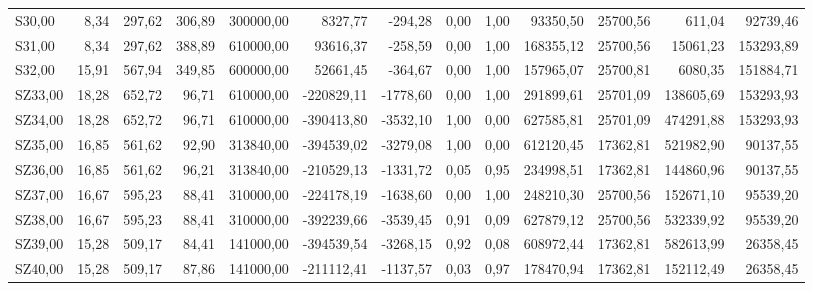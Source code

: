 \begin{longtable}{lrrrrrrrrrrrr}
S30,00 & 8,34 & 297,62 & 306,89 & 300000,00 & 8327,77 & -294,28 & 0,00 & 1,00 & 93350,50 & 25700,56 & 611,04 & 92739,46 \\
S31,00 & 8,34 & 297,62 & 388,89 & 610000,00 & 93616,37 & -258,59 & 0,00 & 1,00 & 168355,12 & 25700,56 & 15061,23 & 153293,89 \\
S32,00 & 15,91 & 567,94 & 349,85 & 600000,00 & 52661,45 & -364,67 & 0,00 & 1,00 & 157965,07 & 25700,81 & 6080,35 & 151884,71 \\
SZ33,00 & 18,28 & 652,72 & 96,71 & 610000,00 & -220829,11 & -1778,60 & 0,00 & 1,00 & 291899,61 & 25701,09 & 138605,69 & 153293,93 \\
SZ34,00 & 18,28 & 652,72 & 96,71 & 610000,00 & -390413,80 & -3532,10 & 1,00 & 0,00 & 627585,81 & 25701,09 & 474291,88 & 153293,93 \\
SZ35,00 & 16,85 & 561,62 & 92,90 & 313840,00 & -394539,02 & -3279,08 & 1,00 & 0,00 & 612120,45 & 17362,81 & 521982,90 & 90137,55 \\
SZ36,00 & 16,85 & 561,62 & 96,21 & 313840,00 & -210529,13 & -1331,72 & 0,05 & 0,95 & 234998,51 & 17362,81 & 144860,96 & 90137,55 \\
SZ37,00 & 16,67 & 595,23 & 88,41 & 310000,00 & -224178,19 & -1638,60 & 0,00 & 1,00 & 248210,30 & 25700,56 & 152671,10 & 95539,20 \\
SZ38,00 & 16,67 & 595,23 & 88,41 & 310000,00 & -392239,66 & -3539,45 & 0,91 & 0,09 & 627879,12 & 25700,56 & 532339,92 & 95539,20 \\
SZ39,00 & 15,28 & 509,17 & 84,41 & 141000,00 & -394539,54 & -3268,15 & 0,92 & 0,08 & 608972,44 & 17362,81 & 582613,99 & 26358,45 \\
SZ40,00 & 15,28 & 509,17 & 87,86 & 141000,00 & -211112,41 & -1137,57 & 0,03 & 0,97 & 178470,94 & 17362,81 & 152112,49 & 26358,45 \\
\hline
\end{longtable}
